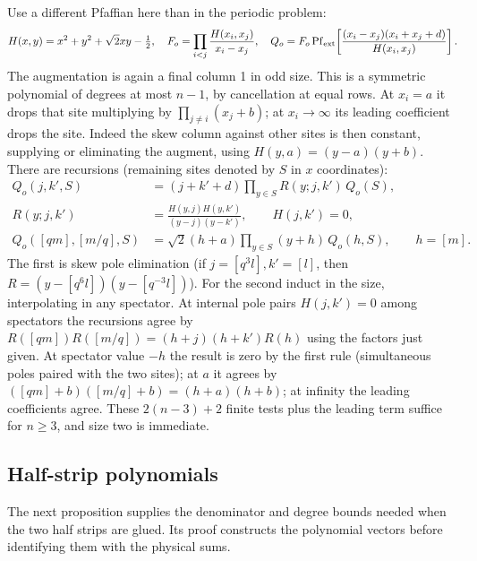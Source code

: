 \documentclass[11pt]{article}
\numberwithin{equation}{section}
\theoremstyle{definition}\newtheorem{definition}[theorem]{Definition}
\theoremstyle{remark}\newtheorem{remark}[theorem]{Remark}
\begin{document}
Use a different Pfaffian here than in the periodic problem:
\[
 H(x,y)=x^2+y^2+\sqrt2 xy-\tfrac12,\quad
 F_o=\prod_{i<j}\frac{H(x_i,x_j)}{x_i-x_j},\quad
 Q_o= F_o\operatorname{Pf}_{\rm ext}\!\left[\frac{(x_i-x_j)(x_i+x_j+d)}{H(x_i,x_j)}\right] .
\]
The augmentation is again a final column 1 in odd size. This is a symmetric polynomial of degrees at most \(n-1\), by cancellation at equal rows. At \(x_i=a\) it drops that site multiplying by \(\prod_{j\ne i}(x_j+b)\); at \(x_i\to\infty\) its leading coefficient drops the site. Indeed the skew column against other sites is then constant, supplying or eliminating the augment, using \(H(y,a)=(y-a)(y+b)\). There are recursions (remaining sites denoted by \(S\) in \(x\) coordinates):
\[
\begin{aligned}
 Q_o(j,k',S)&=(j+k'+d)\prod_{y\in S}R(y;j,k')\,Q_o(S),\\
 R(y;j,k')&=\frac{H(y,j)H(y,k')}{(y-j)(y-k')},\qquad H(j,k')=0,\\
 Q_o([q m],[m/q],S)&=\sqrt2(h+a)\prod_{y\in S}(y+h)\, Q_o(h,S),\qquad h=[m].
\end{aligned}
\]
The first is skew pole elimination (if \(j=[q^3 l],k'=[l]\), then \(R=(y-[q^6 l])(y-[q^{-3}l])\)). For the second induct in the size, interpolating in any spectator. At internal pole pairs \(H(j,k')=0\) among spectators the recursions agree by \(R([q m])R([m/q])=(h+j)(h+k')R(h)\) using the factors just given. At spectator value \(-h\) the result is zero by the first rule (simultaneous poles paired with the two sites); at \(a\) it agrees by \(([q m]+b)([m/q]+b)=(h+a)(h+b)\); at infinity the leading coefficients agree. These \(2(n-3)+2\) finite tests plus the leading term suffice for \(n\ge3\), and size two is immediate.

\subsection{Half-strip polynomials}\label{L:step7}

The next proposition supplies the denominator and degree bounds needed
when the two half strips are glued. Its proof constructs the polynomial
vectors before identifying them with the physical sums.
\end{document}
